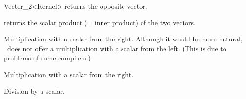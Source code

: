 \begin{ccRefClass} {Vector_2<Kernel>}
       {returns the opposite vector.}

       {returns the scalar product (= inner product) of the two vectors.}


       {Multiplication with a scalar from the right. Although it would
        be more natural, \cgal\ does not offer a multiplication with a 
        scalar from the left. (This is due to problems of some compilers.)}

       {Multiplication with a scalar from the right.}



       {Division by a scalar.}

\ccSeeAlso
{}

\end{ccRefClass} 
